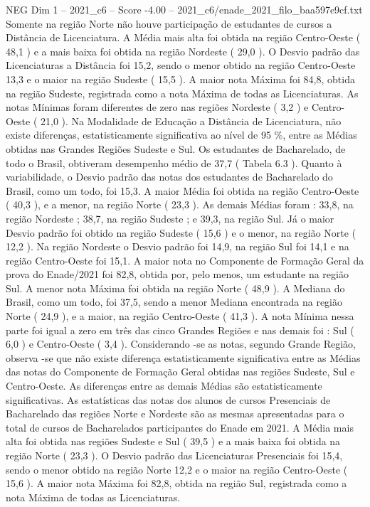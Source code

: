 \begin{textsample}{NEG Dim 1 – 2021\_c6 – Score -4.00 – 2021\_c6/enade\_2021\_filo\_baa597e9cf.txt}
Somente na região Norte não houve participação de estudantes de cursos a Distância de Licenciatura.
A Média mais alta foi obtida na região Centro-Oeste ( 48,1 ) e a mais baixa foi obtida na região Nordeste ( 29,0 ).
O Desvio padrão das Licenciaturas a Distância foi 15,2, sendo o menor obtido na região Centro-Oeste 13,3 e o maior na região Sudeste ( 15,5 ).
A maior nota Máxima foi 84,8, obtida na região Sudeste, registrada como a nota Máxima de todas as Licenciaturas.
As notas Mínimas foram diferentes de zero nas regiões Nordeste ( 3,2 ) e Centro-Oeste ( 21,0 ).
Na Modalidade de Educação a Distância de Licenciatura, não existe diferenças, estatisticamente significativa ao nível de 95 \%, entre as Médias obtidas nas Grandes Regiões Sudeste e Sul.
Os estudantes de Bacharelado, de todo o Brasil, obtiveram desempenho médio de 37,7 ( Tabela 6.3 ).
Quanto à variabilidade, o Desvio padrão das notas dos estudantes de Bacharelado do Brasil, como um todo, foi 15,3.
A maior Média foi obtida na região Centro-Oeste ( 40,3 ), e a menor, na região Norte ( 23,3 ).
As demais Médias foram : 33,8, na região Nordeste ; 38,7, na região Sudeste ; e 39,3, na região Sul.
Já o maior Desvio padrão foi obtido na região Sudeste ( 15,6 ) e o menor, na região Norte ( 12,2 ).
Na região Nordeste o Desvio padrão foi 14,9, na região Sul foi 14,1 e na região Centro-Oeste foi 15,1.
A maior nota no Componente de Formação Geral da prova do Enade/2021 foi 82,8, obtida por, pelo menos, um estudante na região Sul.
A menor nota Máxima foi obtida na região Norte ( 48,9 ).
A Mediana do Brasil, como um todo, foi 37,5, sendo a menor Mediana encontrada na região Norte ( 24,9 ), e a maior, na região Centro-Oeste ( 41,3 ).
A nota Mínima nessa parte foi igual a zero em três das cinco Grandes Regiões e nas demais foi : Sul ( 6,0 ) e Centro-Oeste ( 3,4 ).
Considerando -se as notas, segundo Grande Região, observa -se que não existe diferença estatisticamente significativa entre as Médias das notas do Componente de Formação Geral obtidas nas regiões Sudeste, Sul e Centro-Oeste.
As diferenças entre as demais Médias são estatisticamente significativas.
As estatísticas das notas dos alunos de cursos Presenciais de Bacharelado das regiões Norte e Nordeste são as mesmas apresentadas para o total de cursos de Bacharelados participantes do Enade em 2021.
A Média mais alta foi obtida nas regiões Sudeste e Sul ( 39,5 ) e a mais baixa foi obtida na região Norte ( 23,3 ).
O Desvio padrão das Licenciaturas Presenciais foi 15,4, sendo o menor obtido na região Norte 12,2 e o maior na região Centro-Oeste ( 15,6 ).
A maior nota Máxima foi 82,8, obtida na região Sul, registrada como a nota Máxima de todas as Licenciaturas.

\end{textsample}
